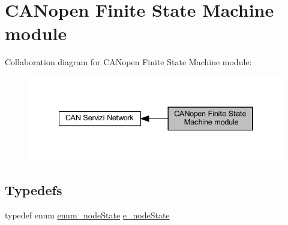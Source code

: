 \hypertarget{group___c_a_nopen___f_s_m__module}{}\section{C\+A\+Nopen Finite State Machine module}
\label{group___c_a_nopen___f_s_m__module}
Collaboration diagram for C\+A\+Nopen Finite State Machine module\+:\nopagebreak
\begin{figure}[H]
\begin{center}
\leavevmode
\includegraphics[width=334pt]{group___c_a_nopen___f_s_m__module}
\end{center}
\end{figure}
\subsection*{Typedefs}
\begin{DoxyCompactItemize}
\item 
typedef enum \mbox{\hyperlink{group___c_a_nopen___f_s_m__module_ga3136d2815abe9d284f985e0a7ec68646}{enum\+\_\+node\+State}} \mbox{\hyperlink{group___c_a_nopen___f_s_m__module_ga5891f63a4c9243179838389a93d084e2}{e\+\_\+node\+State}}
\end{DoxyCompactItemize}
